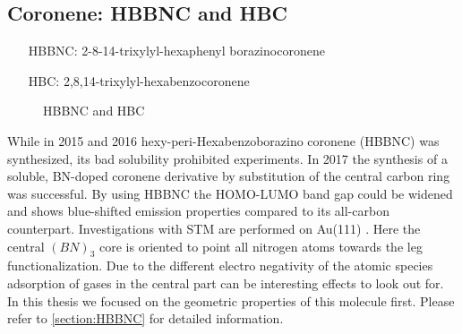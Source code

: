 \subsection{Coronene: HBBNC and HBC}
\label{sec:hbc}
\begin{itemize}
	\item[HBBNC:] 2-8-14-trixylyl-hexaphenyl borazinocoronene
	\item[HBC:] 2,8,14-trixylyl-hexabenzocoronene	
\end{itemize}

\begin{figure}[]\centering
	 \quad
	 \quad
	\caption{ HBBNC and  HBC}
	\label{fig:HBBNC+HBC}
\end{figure}

While in 2015\cite{Krieg_construction_2015} and 2016 \cite{Ciccullo_Quasi-Free-Standing_2016} hexy-peri-Hexabenzoborazino coronene (HBBNC) was synthesized, its bad solubility prohibited experiments. In 2017 the synthesis \cite{dosso_synthesis_2017} of a soluble, BN-doped coronene derivative by substitution of the central carbon ring was successful. By using HBBNC the HOMO-LUMO band gap could be widened and shows blue-shifted emission properties\cite{dosso_synthesis_2017} compared to its all-carbon counterpart. Investigations with STM are performed on Au(111) \cite{Krieg_construction_2015}.
Here the central $(BN)_3$ core is oriented to point all nitrogen atoms towards the leg functionalization.
Due to the different electro negativity of the atomic species adsorption of gases in the central part can be interesting effects to look out for. In this thesis we focused on the geometric properties of this molecule first. Please refer to \autoref{section:HBBNC} for detailed information.


